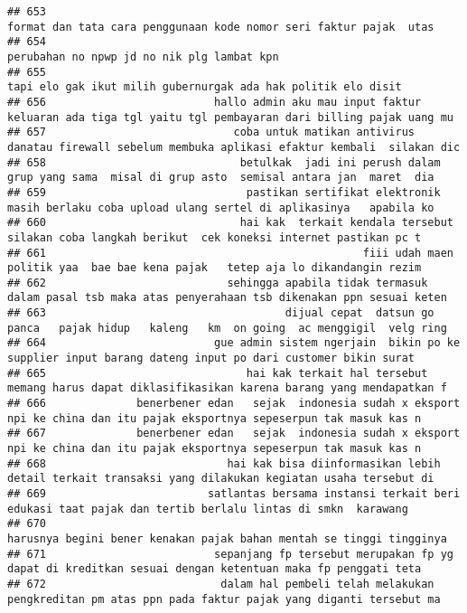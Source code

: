 \documentclass[
]{article}
\begin{document}
\begin{verbatim}
## 653                                                              format dan tata cara penggunaan kode nomor seri faktur pajak  utas 
## 654                                                                                       perubahan no npwp jd no nik plg lambat kpn
## 655                                                                   tapi elo gak ikut milih gubernurgak ada hak politik elo disit 
## 656                          hallo admin aku mau input faktur keluaran ada tiga tgl yaitu tgl pembayaran dari billing pajak uang mu 
## 657                             coba untuk matikan antivirus danatau firewall sebelum membuka aplikasi efaktur kembali  silakan dic 
## 658                              betulkak  jadi ini perush dalam grup yang sama  misal di grup asto  semisal antara jan  maret  dia 
## 659                               pastikan sertifikat elektronik masih berlaku coba upload ulang sertel di aplikasinya   apabila ko 
## 660                              hai kak  terkait kendala tersebut silakan coba langkah berikut  cek koneksi internet pastikan pc t 
## 661                                                 fiii udah maen politik yaa  bae bae kena pajak   tetep aja lo dikandangin rezim 
## 662                            sehingga apabila tidak termasuk dalam pasal tsb maka atas penyerahaan tsb dikenakan ppn sesuai keten 
## 663                                     dijual cepat  datsun go panca   pajak hidup   kaleng   km  on going  ac menggigil  velg ring
## 664                          gue admin sistem ngerjain  bikin po ke supplier input barang dateng input po dari customer bikin surat 
## 665                               hai kak terkait hal tersebut memang harus dapat diklasifikasikan karena barang yang mendapatkan f 
## 666              benerbener edan   sejak  indonesia sudah x eksport npi ke china dan itu pajak eksportnya sepeserpun tak masuk kas n
## 667              benerbener edan   sejak  indonesia sudah x eksport npi ke china dan itu pajak eksportnya sepeserpun tak masuk kas n
## 668                            hai kak bisa diinformasikan lebih detail terkait transaksi yang dilakukan kegiatan usaha tersebut di 
## 669                         satlantas bersama instansi terkait beri edukasi taat pajak dan tertib berlalu lintas di smkn  karawang  
## 670                                                             harusnya begini bener kenakan pajak bahan mentah se tinggi tingginya
## 671                          sepanjang fp tersebut merupakan fp yg dapat di kreditkan sesuai dengan ketentuan maka fp penggati teta 
## 672                           dalam hal pembeli telah melakukan pengkreditan pm atas ppn pada faktur pajak yang diganti tersebut ma 

\end{verbatim}
\end{document}

